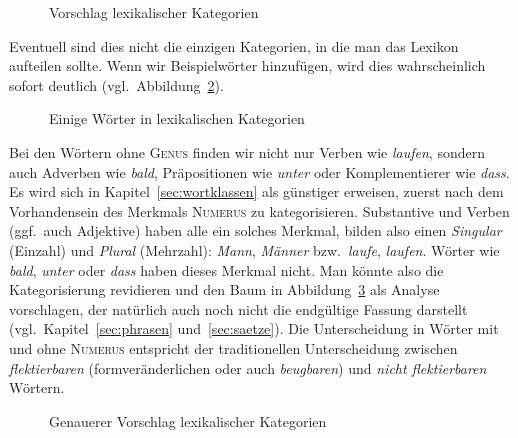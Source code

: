 \begin{figure}[!htbp]
  \centering
\caption{Vorschlag lexikalischer Kategorien}
\label{fig:lexkat01}
\end{figure}

Eventuell sind dies nicht die einzigen Kategorien, in die man das Lexikon aufteilen sollte.
Wenn wir Beispielwörter hinzufügen, wird dies wahrscheinlich sofort deutlich (vgl.\ Abbildung~\ref{fig:lexkat1woerter}).

\begin{figure}[!htbp]
  \centering
  \caption{Einige Wörter in lexikalischen Kategorien}
  \label{fig:lexkat1woerter}
\end{figure}


Bei den Wörtern ohne \textsc{Genus} finden wir nicht nur Verben wie \textit{laufen}, sondern auch Adverben wie \textit{bald}, Präpositionen wie \textit{unter} oder Komplementierer wie \textit{dass}.
Es wird sich in Kapitel~\ref{sec:wortklassen} als günstiger erweisen, zuerst nach dem Vorhandensein des Merkmals \textsc{Numerus} zu kategorisieren.
Substantive und Verben (ggf.\ auch Adjektive) haben alle ein solches Merkmal, bilden also einen \textit{Singular} (Einzahl) und \textit{Plural} (Mehrzahl): \textit{Mann}, \textit{Männer} bzw.\ \textit{laufe}, \textit{laufen}.
Wörter wie \textit{bald}, \textit{unter} oder \textit{dass} haben dieses Merkmal nicht.
Man könnte also die Kategorisierung revidieren und den Baum in Abbildung~\ref{fig:lexkat2} als Analyse vorschlagen, der natürlich auch noch nicht die endgültige Fassung darstellt (vgl.\ Kapitel~\ref{sec:phrasen} und~\ref{sec:saetze}).
Die Unterscheidung in Wörter mit und ohne \textsc{Numerus} entspricht der traditionellen Unterscheidung zwischen \textit{flektierbaren} (formveränderlichen oder auch \textit{beugbaren}) und \textit{nicht flektierbaren} Wörtern.

\begin{figure}[!htbp]
  \centering
  \caption{Genauerer Vorschlag lexikalischer Kategorien}
  \label{fig:lexkat2}
\end{figure}


